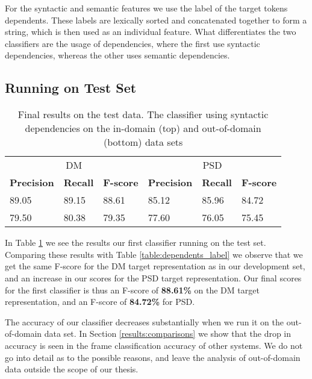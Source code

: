 For the syntactic and semantic features we use the label of the target tokens dependents. These labels are lexically sorted and concatenated together to form a string, which is then used as an individual feature. What differentiates the two classifiers are the usage of dependencies, where the first use syntactic dependencies, whereas the other uses semantic dependencies.

\subsection{Running on Test Set}

\begin{table}
    \centering
    \smaller[0.2]
    \begin{tabular}{@{}llllll@{}}
        \toprule
        \multicolumn{3}{c}{DM}
        & \multicolumn{3}{c}{PSD} \\
        \textbf{Precision} & \textbf{Recall} & \textbf{F-score} & \textbf{Precision} & \textbf{Recall} & \textbf{F-score} \\
        \midrule
        89.05 & 89.15 & 88.61 & 85.12 & 85.96 & 84.72 \\
        79.50 & 80.38 & 79.35 & 77.60 & 76.05 & 75.45 \\
        \bottomrule
    \end{tabular}
    \caption{Final results on the test data. The classifier using syntactic dependencies on the in-domain (top) and out-of-domain (bottom) data sets} 
    \label{table:final_results_syntax}
\end{table}

In Table \ref{table:final_results_syntax} we see the results our first classifier running on the test set. Comparing these results with Table \ref{table:dependents_label} we observe that we get the same F-score for the DM target representation as in our development set, and an increase in our scores for the PSD target representation. Our final scores for the first classifier is thus an F-score of \textbf{88.61\%} on the DM target representation, and an F-score of \textbf{84.72\%} for PSD. 

The accuracy of our classifier decreases substantially when we run it on the out-of-domain data set. In Section \ref{results:comparisons} we show that the drop in accuracy is seen in the frame classification accuracy of other systems. We do not go into detail as to the possible reasons, and leave the analysis of out-of-domain data outside the scope of our thesis.


